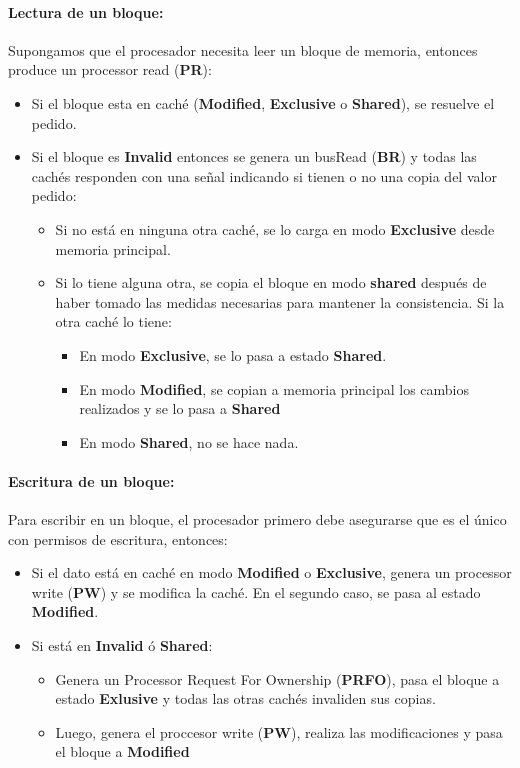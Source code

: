\paragraph{Lectura de un bloque:}
Supongamos que el procesador necesita leer un bloque de memoria, entonces produce un processor read (\textbf{PR}):
\begin{itemize}
	\item Si el bloque esta en caché (\textbf{Modified}, \textbf{Exclusive} o \textbf{Shared}), se resuelve el pedido.
	\item Si el bloque es \textbf{Invalid} entonces se genera un busRead (\textbf{BR}) y todas las cachés responden con una señal indicando si tienen o no una copia del valor pedido:
	\begin{itemize}
		\item Si no está en ninguna otra caché, se lo carga en modo \textbf{Exclusive} desde memoria principal.
		\item Si lo tiene alguna otra, se copia el bloque en modo \textbf{shared} después de haber tomado las medidas necesarias para mantener la consistencia. Si la otra caché lo tiene:
		\begin{itemize}
			\item En modo \textbf{Exclusive}, se lo pasa a estado \textbf{Shared}.
			\item En modo \textbf{Modified}, se copian a memoria principal los cambios realizados y se lo pasa a \textbf{Shared}
			\item En modo \textbf{Shared}, no se hace nada.
		\end{itemize}
	\end{itemize}
\end{itemize}

\paragraph{Escritura de un bloque:} Para escribir en un bloque, el procesador primero debe asegurarse que es el único con permisos de escritura, entonces:

\begin{itemize}
	\item Si el dato está en caché en modo \textbf{Modified} o \textbf{Exclusive}, genera un processor write (\textbf{PW}) y se modifica la caché. En el segundo caso, se pasa al estado \textbf{Modified}.
	\item Si está en \textbf{Invalid} ó \textbf{Shared}:
	\begin{itemize}
		\item Genera un Processor Request For Ownership (\textbf{PRFO}), pasa el bloque a estado \textbf{Exlusive} y todas las otras cachés invaliden sus copias.
		\item Luego, genera el proccesor write (\textbf{PW}), realiza las modificaciones y pasa el bloque a \textbf{Modified}
	\end{itemize}
\end{itemize}
\newpage
